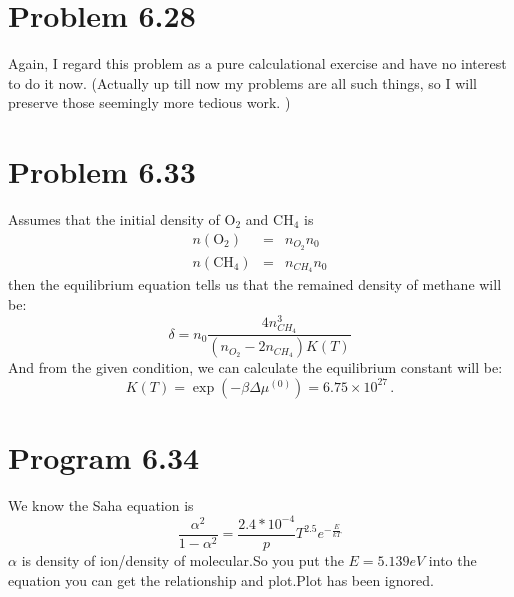 \documentclass{article}
\begin{document}


\section*{Problem 6.28}
Again, I regard this problem as a pure calculational exercise and have no interest to do it now. (Actually up till now my problems are all such things, so I will preserve those seemingly more tedious work. )

\section*{Problem 6.33}
Assumes that the initial density of $\mathrm{O}_2$ and $\mathrm{CH}_4$ is 
\begin{eqnarray*}
n(\mathrm{O}_2) &=& n_{O_2}n_0\\
n(\mathrm{CH}_4)&=& n_{CH_4}n_0
\end{eqnarray*}
then the equilibrium equation tells us that the remained density of methane will be:
\begin{equation}
\delta = n_0 \frac{4n_{CH_4}^3}{(n_{O_2}-2n_{CH_4})K(T)}
\end{equation}
And from the given condition, we can calculate the equilibrium constant will be:
\begin{equation}
K(T) = \exp\left(-\beta \Delta \mu^{(0)}\right) = 6.75\times 10^{27}\,.
\end{equation}


\section*{Program 6.34}
We know the Saha equation is
$$\frac{\alpha^2}{1-\alpha^2}=\frac{2.4*10^{-4}}{p}T^2.5e^{-\frac{E}{kT}}$$
$\alpha$ is density of ion/density of molecular.So you put the $E=5.139eV$ into the equation you can get the relationship and plot.Plot has been ignored.
\end{document}
